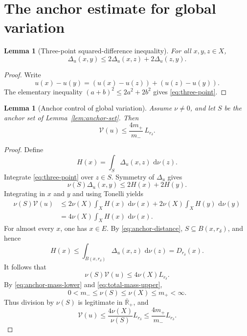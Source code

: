 \documentclass[11pt]{article}
\newtheorem{lemma}[theorem]{Lemma}
\theoremstyle{remark}
\newcommand{\Rbarp}{\overline{\mathbb R}_{+}}
\newcommand{\dd}{\,\mathrm{d}}
\newcommand{\Venergy}{\mathcal V}
\begin{document}
\section{The anchor estimate for global variation}

\begin{lemma}[Three-point squared-difference inequality]                  \label{lem:three-point}
For all \(x,y,z\in X\),
\begin{equation}
  \Delta_u(x,y)
  \leq
  2\Delta_u(x,z)+2\Delta_u(z,y).                                         \label{eq:three-point}
\end{equation}
\end{lemma}

\begin{proof}
Write
\[
  u(x)-u(y)
  =
  (u(x)-u(z))+(u(z)-u(y)).
\]
The elementary inequality \((a+b)^2\leq2a^2+2b^2\) gives
\eqref{eq:three-point}.
\end{proof}

\begin{lemma}[Anchor control of global variation]                          \label{lem:anchor-variation}
Assume \(\nu\neq0\), and let \(S\) be the anchor set of
Lemma~\ref{lem:anchor-set}.  Then
\begin{equation}
  \Venergy(u)
  \leq
  \frac{4m_+}{m_-}\,L_{r_\delta}.                                        \label{eq:variation-by-local}
\end{equation}
\end{lemma}

\begin{proof}
Define
\[
  H(x)
  =
  \int_S\Delta_u(x,z)\,\dd\nu(z).
\]
Integrate \eqref{eq:three-point} over \(z\in S\).  Symmetry of
\(\Delta_u\) gives
\begin{equation}
  \nu(S)\Delta_u(x,y)
  \leq
  2H(x)+2H(y).                                                            \label{eq:point-anchor}
\end{equation}
Integrating in \(x\) and \(y\) and using Tonelli yields
\begin{align*}
  \nu(S)\Venergy(u)
  &\leq
  2\nu(X)\int_XH(x)\,\dd\nu(x)
  +
  2\nu(X)\int_XH(y)\,\dd\nu(y)\\
  &=
  4\nu(X)\int_XH(x)\,\dd\nu(x).
\end{align*}
For almost every \(x\), one has \(x\in E\).  By
\eqref{eq:anchor-distance}, \(S\subseteq B(x,r_\delta)\), and hence
\[
  H(x)
  \leq
  \int_{B(x,r_\delta)}\Delta_u(x,z)\,\dd\nu(z)
  =
  D_{r_\delta}(x).
\]
It follows that
\begin{equation}
  \nu(S)\Venergy(u)
  \leq
  4\nu(X)L_{r_\delta}.                                                     \label{eq:uncancelled-anchor}
\end{equation}
By \eqref{eq:anchor-mass-lower} and
\eqref{eq:total-mass-upper},
\[
  0<m_-\leq\nu(S)\leq\nu(X)\leq m_+<\infty.
\]
Thus division by \(\nu(S)\) is legitimate in \(\Rbarp\), and
\[
  \Venergy(u)
  \leq
  \frac{4\nu(X)}{\nu(S)}L_{r_\delta}
  \leq
  \frac{4m_+}{m_-}L_{r_\delta}.
\]
\end{proof}
\end{document}
